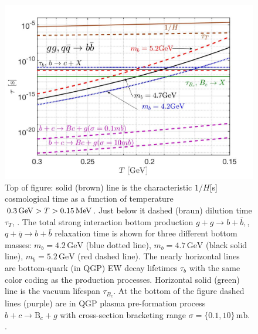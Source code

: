 \begin{figure} 
\centerline{\includegraphics[width=0.85\linewidth]{./plots/BQuarkReactionTime003}}
\caption{{\color{black}Top of figure: solid (brown) line is the characteristic $1/H$[s] cosmological time as a function of temperature $0.3\,\mathrm{GeV}>T> 0.15\text{\,MeV}$. Just below it dashed (braun) dilution time $\tau_T$, . The total strong interaction bottom production $g+g\to b+\bar{b},$, $q+\bar q\to b+\bar{b}$ relaxation time is shown for three different bottom masses: $m_b=4.2\,\mathrm{GeV}$ (blue dotted line), $m_b=4.7\,\mathrm{GeV}$ (black solid line), $m_b=5.2\,\mathrm{GeV}$ (red dashed line). The nearly horizontal lines are bottom-quark (in QGP) EW decay lifetimes $\tau_b$ with the same color coding as the production processes. Horizontal solid (green) line is the vacuum lifespan $\tau_{B_c}$. At the bottom of the figure dashed lines (purple) are in QGP plasma pre-formation process $b+c\rightarrow \mathrm{B}_c+g$ with cross-section bracketing range $\sigma=\{0.1,10\} \,\mathrm{mb}$. .
}}
\label{ReactionTime}
\end{figure}

